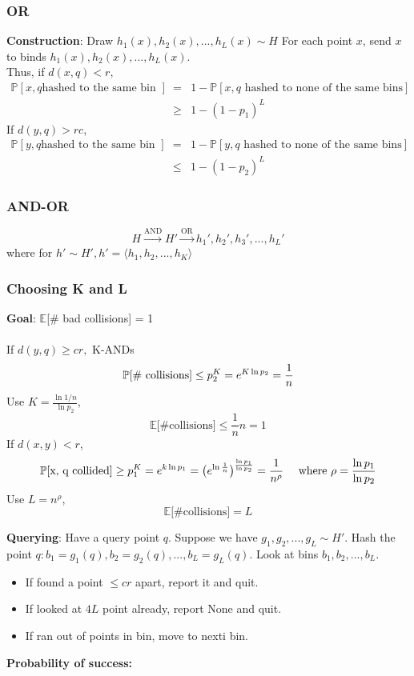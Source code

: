 \documentclass[12pt]{article}
\begin{document}
\subsubsection{OR}
\textbf{Construction}: Draw $h_1(x), h_2(x), ..., h_L(x) \sim H$ For each point $x$, send $x$ to binds $h_1(x), h_2(x), ..., h_L(x)$. \\
Thus, if $d(x, q) < r,$
\begin{eqnarray*}
\mathbb{P}[x, q \textrm{hashed to the same bin\ }] &=& 1 - \mathbb{P}[x, q \textrm{\ hashed to none of the same bins}]\\
&\geq & 1 - (1-p_1)^L
\end{eqnarray*}
If $d(y,q) > rc$,
\begin{eqnarray*}
\mathbb{P}[y, q \textrm{hashed to the same bin\ }] &=& 1 - \mathbb{P}[y, q \textrm{\ hashed to none of the same bins}]\\
&\leq & 1 - (1-p_2)^L
\end{eqnarray*}

\subsubsection{AND-OR}
$$H \xrightarrow{\text{AND}} H'  \xrightarrow{\text{OR}} h_1', h_2', h_3', ..., h_L'$$
where for $h' \sim H', h' = \langle h_1, h_2, ..., h_K \rangle$

\subsubsection{Choosing K and L}
\textbf{Goal}: $\mathbb{E}$[\# bad collisions] = 1\\ \\
If $d(y, q) \geq cr,$ K-ANDs
$$ \mathbb{P} \textrm{[\# collisions]} \leq p_2^K = e^{K\ln p_2}=\frac{1}{n}$$
Use $K = \frac{\ln 1/n}{\ln p_2}$, $$\mathbb{E}\textrm{[\# collisions]} \leq \frac{1}{n}n = 1$$
If $d(x, y)<r$, $$\mathbb{P} \textrm{[x, q collided]} \geq p_1^K = e^{k\ln p_1} = \big( e^{\ln \frac{1}{n}} \big) ^ {\frac{\ln p_1}{\ln p_2}} = \frac{1}{n^\rho} \textrm{\ \ \ \ where } \rho = \frac{\ln p_1}{\ln p_2}$$
Use $L = n^\rho$,
$$\mathbb{E} \textrm{[\# collisions]} = L$$

\textbf{Querying}: Have a query point $q$. Suppose we have $g_1, g_2, ..., g_L \sim H'$. Hash the point $q: b_1 = g_1(q), b_2 = g_2(q), ..., b_L = g_L(q)$. Look at bins $b_1, b_2, ..., b_L$.
\begin{itemize}
  \item If found a point $\leq cr$ apart, report it and quit.
  \item If looked at $4L$ point already, report None and quit.
  \item If ran out of points in bin, move to nexti bin.
\end{itemize}
\textbf{Probability of success:}
\end{document}

